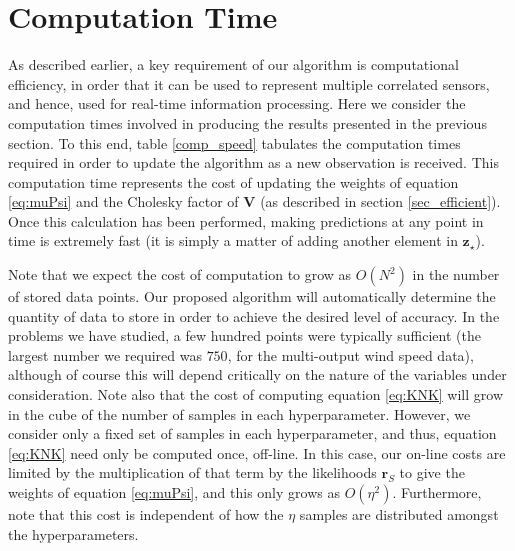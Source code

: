 \documentclass{acmtrans2m}
\newcommand{\vect}[1]{\boldsymbol{#1}}
\newcommand{\vzst}{\vect{z}_\star}
\newcommand{\mat}[1]{\mathbf{#1}}
\begin{document}
\section{Computation Time}\label{sec_computation}

\noindent As described earlier, a key requirement of our algorithm is computational efficiency, in order that it can be used to represent multiple correlated sensors, and hence, used for real-time information processing. Here we consider the computation times involved in producing the results presented in the previous section. To this end, table \ref{comp_speed} tabulates the computation times required in order to update the algorithm as a new observation is received. This computation time represents the cost of updating the weights of equation \eqref{eq:muPsi} and the Cholesky factor of $\mat{V}$ (as described in section \ref{sec_efficient}). Once this calculation has been performed, making predictions at any point in time is extremely fast (it is simply a matter of adding another element in $\vzst$).

Note that we expect the cost of computation to grow as $O(N^2)$ in the number of stored data points. Our proposed algorithm will automatically determine the quantity of data to store in order to achieve the desired level of accuracy. In the problems we have studied, a few hundred points were typically sufficient (the largest number we required was $750$, for the multi-output wind speed data), although of course this will depend critically on the nature of the variables under consideration. Note also that the cost of computing equation \eqref{eq:KNK} will grow in the cube of the number of samples in each hyperparameter. However, we consider only a fixed set of samples in each hyperparameter, and thus, equation \eqref{eq:KNK} need only be computed once, off-line. In this case, our on-line costs are limited by the multiplication of that term by the likelihoods $\vect{r}_S$ to give the weights of equation \eqref{eq:muPsi}, and this only grows as $O(\eta^2)$. Furthermore, note that this cost is independent of how the $\eta$ samples are distributed amongst the hyperparameters.
\end{document}
